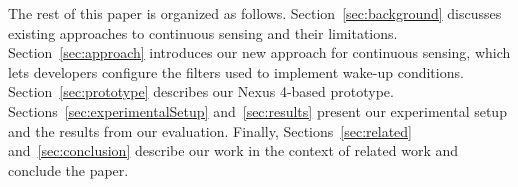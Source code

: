 The rest of this paper is organized as follows.
Section~\ref{sec:background} discusses existing approaches to
continuous sensing and their limitations.  Section~\ref{sec:approach}
introduces our new approach for continuous sensing, which lets
developers configure the filters used to implement wake-up conditions.
Section~\ref{sec:prototype} describes our Nexus 4-based prototype.
Sections~\ref{sec:experimentalSetup} and~\ref{sec:results} present our
experimental setup and the results from our evaluation.  Finally,
Sections~\ref{sec:related} and~\ref{sec:conclusion} describe our work
in the context of related work and conclude the paper.

